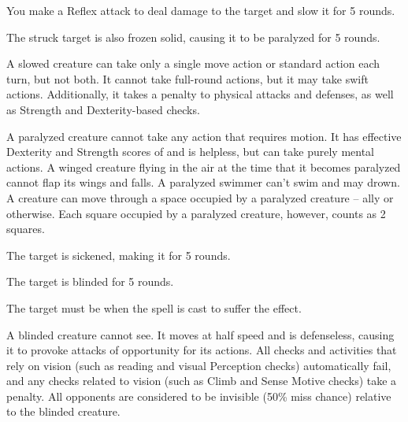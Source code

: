 \spellrng{\rngclose}
\begin{spellhealthy}
    You make a Reflex attack to deal damage to the target and slow it for 5 rounds.
\end{spellhealthy}
\begin{spellblood}
    The struck target is also frozen solid, causing it to be paralyzed for 5 rounds.
\end{spellblood}
\begin{spellnotes}
A slowed creature can take only a single move action or standard action each turn, but not both. It cannot take full-round actions, but it may take swift actions. Additionally, it takes a  penalty to physical attacks and defenses, as well as Strength and Dexterity-based checks.

   A paralyzed creature cannot take any action that requires motion. It has effective Dexterity and Strength scores of  and is helpless, but can take purely mental actions. A winged creature flying in the air at the time that it becomes paralyzed cannot flap its wings and falls. A paralyzed swimmer can't swim and may drown. A creature can move through a space occupied by a paralyzed creature -- ally or otherwise. Each square occupied by a paralyzed creature, however, counts as 2 squares.
 \end{spellnotes}

\spellrng{\rngclose}
\begin{spellhealthy}
  The target is sickened, making it \vulnerable for 5 rounds.
\end{spellhealthy}
\begin{spellblood}
  The target is blinded for 5 rounds.
\end{spellblood}
\begin{spellnotes}
  The target must be \bloodied when the spell is cast to suffer the \bloodied effect.

A blinded creature cannot see. It moves at half speed and is defenseless, causing it to provoke attacks of opportunity for its actions. All checks and activities that rely on vision (such as reading and visual Perception checks) automatically fail, and any checks related to vision (such as Climb and Sense Motive checks) take a  penalty. All opponents are considered to be invisible (50\% miss chance) relative to the blinded creature.
\end{spellnotes}

